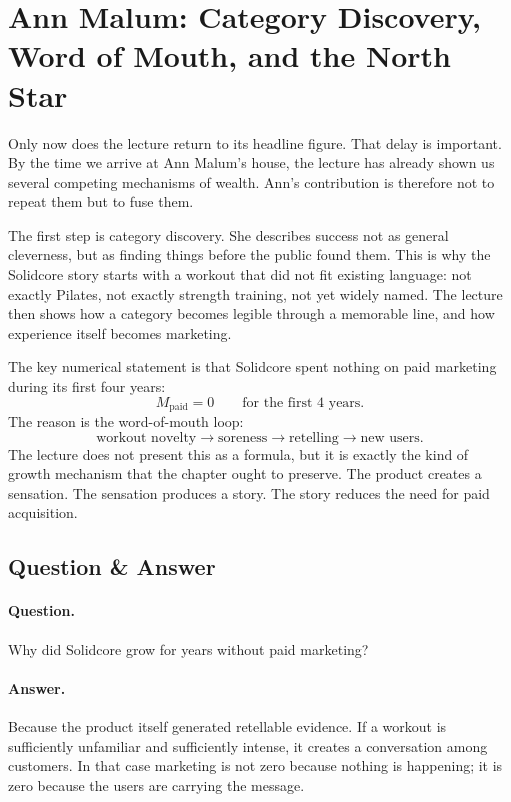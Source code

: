 \section{Ann Malum: Category Discovery, Word of Mouth, and the North Star}

Only now does the lecture return to its headline figure. That delay is important. By the time we arrive at Ann Malum's house, the lecture has already shown us several competing mechanisms of wealth. Ann's contribution is therefore not to repeat them but to fuse them.

The first step is category discovery. She describes success not as general cleverness, but as finding things before the public found them. This is why the Solidcore story starts with a workout that did not fit existing language: not exactly Pilates, not exactly strength training, not yet widely named. The lecture then shows how a category becomes legible through a memorable line, and how experience itself becomes marketing.

The key numerical statement is that Solidcore spent nothing on paid marketing during its first four years:
\begin{equation}
M_{\mathrm{paid}} = 0
\qquad
\text{for the first }4\text{ years.}
\end{equation}
The reason is the word-of-mouth loop:
\begin{equation}
\text{workout novelty} \to \text{soreness} \to \text{retelling} \to \text{new users}.
\end{equation}
The lecture does not present this as a formula, but it is exactly the kind of growth mechanism that the chapter ought to preserve. The product creates a sensation. The sensation produces a story. The story reduces the need for paid acquisition.

\subsection{Question \& Answer}

\paragraph{Question.} Why did Solidcore grow for years without paid marketing?

\paragraph{Answer.} Because the product itself generated retellable evidence. If a workout is sufficiently unfamiliar and sufficiently intense, it creates a conversation among customers. In that case marketing is not zero because nothing is happening; it is zero because the users are carrying the message.

